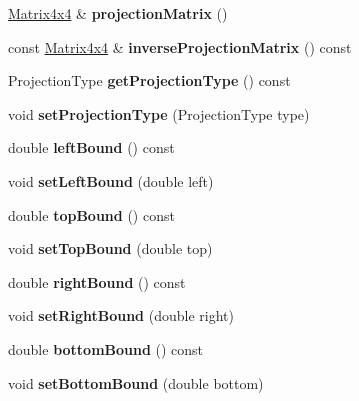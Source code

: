 \begin{Indent}
\begin{DoxyCompactItemize}
\mbox{\label{classrev_1_1_render_projection_a670e351cf753c7a86f49ecfd1d2a842c}} 
\mbox{\hyperlink{classrev_1_1_square_matrix}{Matrix4x4}} \& {\bfseries projection\+Matrix} ()
\item 
\mbox{\label{classrev_1_1_render_projection_ae973d60f484363b2a7c4ded4312cd8f8}} 
const \mbox{\hyperlink{classrev_1_1_square_matrix}{Matrix4x4}} \& {\bfseries inverse\+Projection\+Matrix} () const
\item 
\mbox{\label{classrev_1_1_render_projection_a6c7d75b6bd5c4c27a1db4bbacbf2263c}} 
Projection\+Type {\bfseries get\+Projection\+Type} () const
\item 
\mbox{\label{classrev_1_1_render_projection_aba9f4ff8b323c48ac9a5887bbc89b285}} 
void {\bfseries set\+Projection\+Type} (Projection\+Type type)
\item 
\mbox{\label{classrev_1_1_render_projection_a7d31bebcaf314f5fdd4e39bdfd09ac7a}} 
double {\bfseries left\+Bound} () const
\item 
\mbox{\label{classrev_1_1_render_projection_a87e6150e0ed631734cc20c25c110fd13}} 
void {\bfseries set\+Left\+Bound} (double left)
\item 
\mbox{\label{classrev_1_1_render_projection_af1a96a9c64e0ffad5b75d1c870a78adb}} 
double {\bfseries top\+Bound} () const
\item 
\mbox{\label{classrev_1_1_render_projection_a0a2b2f3e62afc1eee277f81565e21eaf}} 
void {\bfseries set\+Top\+Bound} (double top)
\item 
\mbox{\label{classrev_1_1_render_projection_a694c5a26f2cbc34730e6fb7a281bec0f}} 
double {\bfseries right\+Bound} () const
\item 
\mbox{\label{classrev_1_1_render_projection_a1c4cc0cd74f0756c005971cbe9395162}} 
void {\bfseries set\+Right\+Bound} (double right)
\item 
\mbox{\label{classrev_1_1_render_projection_a8fad4765e9905044ded3ffdf9a83b296}} 
double {\bfseries bottom\+Bound} () const
\item 
\mbox{\label{classrev_1_1_render_projection_a1972dcd43d7ce8a3e29e947a9bd7d790}} 
void {\bfseries set\+Bottom\+Bound} (double bottom)
\end{DoxyCompactItemize}
\end{Indent}
